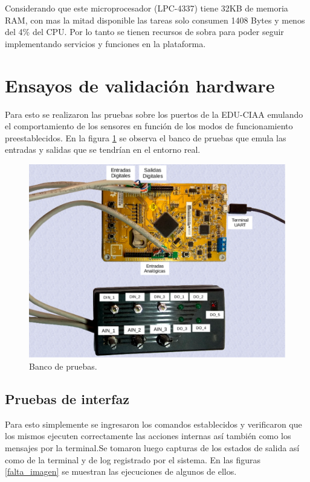 Considerando que este microprocesador (LPC-4337) tiene 32KB de memoria RAM, con mas la mitad disponible las tareas solo consumen 1408 Bytes y menos del 4\% del CPU. Por lo tanto se tienen recursos de sobra para poder seguir implementando servicios y funciones en la plataforma.

\section{ Ensayos de validación hardware }
\label{sec:pruebasHW}

Para esto se realizaron las pruebas sobre los puertos de la EDU-CIAA emulando el comportamiento de los sensores en función de los modos de funcionamiento preestablecidos. En la figura \ref{fig:foto_prototipo} se observa el banco de pruebas que emula las entradas y salidas que se tendrían en el entorno real.
\begin{figure}[h!]
	\centering
	\includegraphics[width=1.0\textwidth]{Figures/Cap_4/foto_prototipo}
	\caption{Banco de pruebas.}
	\label{fig:foto_prototipo}
\end{figure}

\subsection{ Pruebas de interfaz }

Para esto simplemente se ingresaron los comandos establecidos y verificaron que los mismos ejecuten correctamente las acciones internas así también como los mensajes por la terminal.Se tomaron luego capturas de los estados de salida así como de la terminal y de log registrado por el sistema. En las figuras \ref{falta_imagen} se muestran las ejecuciones de algunos de ellos.



